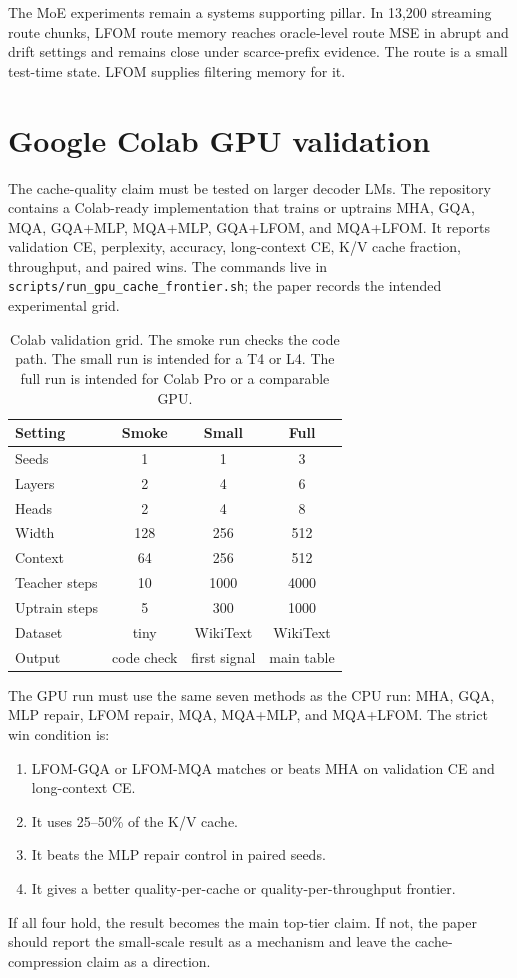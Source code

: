 \documentclass[10pt,twocolumn]{article}
\begin{document}
The MoE experiments remain a systems supporting pillar. In 13,200 streaming route chunks, LFOM route memory reaches oracle-level route MSE in abrupt and drift settings and remains close under scarce-prefix evidence. The route is a small test-time state. LFOM supplies filtering memory for it.


\section{Google Colab GPU validation}\label{sec:colab}
The cache-quality claim must be tested on larger decoder LMs. The repository contains a Colab-ready implementation that trains or uptrains MHA, GQA, MQA, GQA+MLP, MQA+MLP, GQA+LFOM, and MQA+LFOM. It reports validation CE, perplexity, accuracy, long-context CE, K/V cache fraction, throughput, and paired wins. The commands live in \texttt{scripts/run\_gpu\_cache\_frontier.sh}; the paper records the intended experimental grid.

\begin{table}[t]
\centering
\caption{Colab validation grid. The smoke run checks the code path. The small run is intended for a T4 or L4. The full run is intended for Colab Pro or a comparable GPU.}
\scriptsize
\begin{tabular}{lccc}
\toprule
Setting & Smoke & Small & Full \\
\midrule
Seeds & 1 & 1 & 3 \\
Layers & 2 & 4 & 6 \\
Heads & 2 & 4 & 8 \\
Width & 128 & 256 & 512 \\
Context & 64 & 256 & 512 \\
Teacher steps & 10 & 1000 & 4000 \\
Uptrain steps & 5 & 300 & 1000 \\
Dataset & tiny & WikiText & WikiText \\
Output & code check & first signal & main table \\
\bottomrule
\end{tabular}
\label{tab:colab-grid}
\end{table}

The GPU run must use the same seven methods as the CPU run: MHA, GQA, MLP repair, LFOM repair, MQA, MQA+MLP, and MQA+LFOM. The strict win condition is:
\begin{enumerate}[leftmargin=*,itemsep=1pt]
\item LFOM-GQA or LFOM-MQA matches or beats MHA on validation CE and long-context CE.
\item It uses 25--50\% of the K/V cache.
\item It beats the MLP repair control in paired seeds.
\item It gives a better quality-per-cache or quality-per-throughput frontier.
\end{enumerate}
If all four hold, the result becomes the main top-tier claim. If not, the paper should report the small-scale result as a mechanism and leave the cache-compression claim as a direction.
\end{document}
